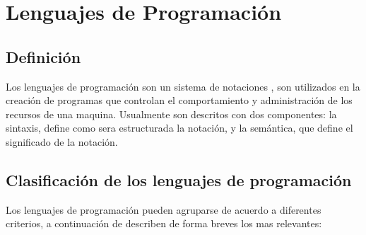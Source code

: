 \section{Lenguajes de Programación}

\subsection{Definición}
Los lenguajes de programación son un sistema de notaciones \cite{louden-josemi20}, son utilizados en la creación de programas que controlan el comportamiento y administración de los recursos de una maquina. Usualmente son descritos con dos componentes: la sintaxis, define como sera estructurada la notación, y la semántica, que define el significado de la notación. 


\subsection{ Clasificación de los lenguajes de programación}

Los lenguajes de programación pueden agruparse de acuerdo a diferentes criterios, a continuación de describen de forma breves los mas relevantes:

